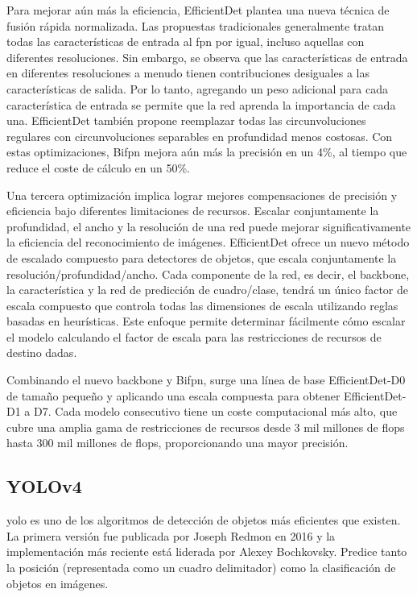 Para mejorar aún más la eficiencia, EfficientDet plantea una nueva técnica de fusión rápida normalizada. Las propuestas tradicionales generalmente tratan todas las características de entrada al \gls{fpn} por igual, incluso aquellas con diferentes resoluciones. Sin embargo, se observa que las características de entrada en diferentes resoluciones a menudo tienen contribuciones desiguales a las características de salida. Por lo tanto, agregando un peso adicional para cada característica de entrada se permite que la red aprenda la importancia de cada una. EfficientDet también propone reemplazar todas las circunvoluciones regulares con circunvoluciones separables en profundidad menos costosas. Con estas optimizaciones, Bi\gls{fpn} mejora aún más la precisión en un 4\%, al tiempo que reduce el coste de cálculo en un 50\%.

Una tercera optimización implica lograr mejores compensaciones de precisión y eficiencia bajo diferentes limitaciones de recursos. Escalar conjuntamente la profundidad, el ancho y la resolución de una red puede mejorar significativamente la eficiencia del reconocimiento de imágenes. EfficientDet ofrece un nuevo método de escalado compuesto para detectores de objetos, que escala conjuntamente la resolución/profundidad/ancho. Cada componente de la red, es decir, el backbone, la característica y la red de predicción de cuadro/clase, tendrá un único factor de escala compuesto que controla todas las dimensiones de escala utilizando reglas basadas en heurísticas. Este enfoque permite determinar fácilmente cómo escalar el modelo calculando el factor de escala para las restricciones de recursos de destino dadas.

Combinando el nuevo backbone y Bi\gls{fpn}, surge una línea de base EfficientDet-D0 de tamaño pequeño y aplicando una escala compuesta para obtener EfficientDet-D1 a D7. Cada modelo consecutivo tiene un coste computacional más alto, que cubre una amplia gama de restricciones de recursos desde 3 mil millones de \gls{flops} hasta 300 mil millones de \gls{flops}, proporcionando una mayor precisión.

\subsection{YOLOv4}
\label{subsec:yolov4}

\gls{yolo} \cite{bochkovskiy2020yolov4} es uno de los algoritmos de detección de objetos más eficientes que existen. La primera versión fue publicada por Joseph Redmon \cite{redmon2016look} en 2016 y la implementación más reciente \cite{bochkovskiy2020yolov4} está liderada por Alexey Bochkovsky. Predice tanto la posición (representada como un cuadro delimitador) como la clasificación de objetos en imágenes.

